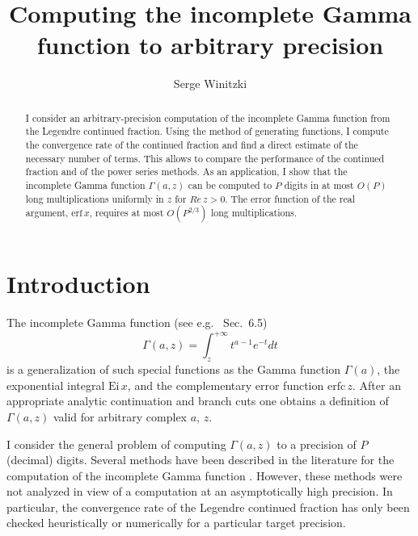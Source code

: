 \documentclass{llncs}
\begin{document}
\title{Computing the incomplete Gamma function to arbitrary precision}

\author{Serge Winitzki}

\maketitle

\begin{abstract}
I consider an arbitrary-precision computation of the incomplete Gamma
function from the Legendre continued fraction. Using the method of
generating functions, I compute the convergence rate of the continued
fraction and find a direct estimate of the necessary number of terms.
This allows to compare the performance of the continued fraction and
of the power series methods. As an application, I show that the incomplete
Gamma function $\Gamma \left(a,z\right)$ can be computed to $P$
digits in at most $O\left(P\right)$ long multiplications uniformly
in $z$ for $Re\, z>0$. The error function of the real argument,
$\textrm{erf}\, x$, requires at most $O(P^{2/3})$ long multiplications.
\end{abstract}

\section{Introduction}

The incomplete Gamma function (see e.g.~\cite{AS64} Sec.~6.5)\begin{equation}
\Gamma \left(a,z\right)=\int _{z}^{+\infty }t^{a-1}e^{-t}dt\end{equation}
 is a generalization of such special functions as the Gamma function
$\Gamma \left(a\right)$, the exponential integral $\textrm{Ei}\, x$,
and the complementary error function $\textrm{erfc}\, z$. After an
appropriate analytic continuation and branch cuts one obtains a definition
of $\Gamma \left(a,z\right)$ valid for arbitrary complex $a$, $z$.

I consider the general problem of computing $\Gamma \left(a,z\right)$
to a precision of $P$ (decimal) digits. Several methods have been
described in the literature for the computation of the incomplete
Gamma function \cite{Gautschi79,DM86,Gautschi99,Smith01}. However,
these methods were not analyzed in view of a computation at an asymptotically
high precision. In particular, the convergence rate of the Legendre
continued fraction has only been checked heuristically or numerically
for a particular target precision. 
\end{document}
